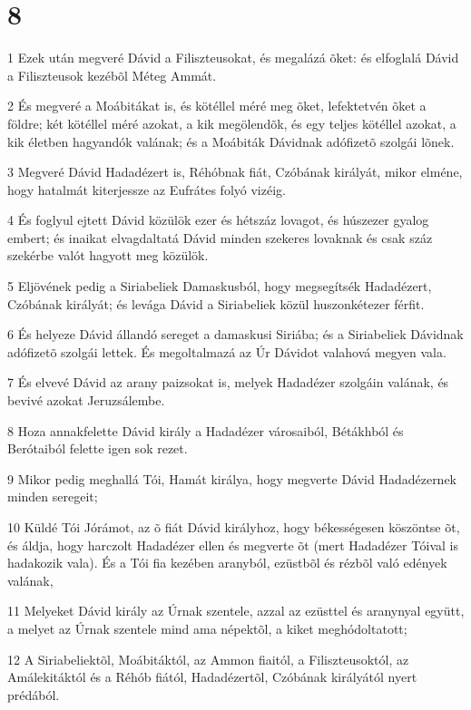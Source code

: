 \chapter{8}

\par 1 Ezek után megveré Dávid a Filiszteusokat, és megalázá õket: és elfoglalá Dávid a Filiszteusok kezébõl Méteg Ammát.
\par 2 És megveré a Moábitákat is, és kötéllel méré meg õket, lefektetvén õket a földre; két kötéllel méré azokat, a kik megölendõk, és egy teljes kötéllel azokat, a kik életben hagyandók valának; és a Moábiták Dávidnak  adófizetõ szolgái lõnek.
\par 3 Megveré Dávid Hadadézert is, Réhóbnak fiát, Czóbának királyát, mikor elméne, hogy hatalmát kiterjessze az Eufrátes folyó vizéig.
\par 4 És foglyul ejtett Dávid közülök ezer és hétszáz lovagot, és húszezer gyalog embert; és inaikat elvagdaltatá Dávid minden szekeres lovaknak és csak száz szekérbe valót hagyott meg közülök.
\par 5 Eljövének pedig a Siriabeliek Damaskusból, hogy megsegítsék Hadadézert, Czóbának királyát; és levága Dávid a Siriabeliek közül huszonkétezer férfit.
\par 6 És helyeze Dávid állandó sereget a damaskusi Siriába; és a Siriabeliek Dávidnak adófizetõ szolgái lettek. És megoltalmazá az Úr Dávidot valahová megyen vala.
\par 7 És elvevé Dávid az arany paizsokat is, melyek Hadadézer szolgáin valának, és bevivé azokat Jeruzsálembe.
\par 8 Hoza annakfelette Dávid király a Hadadézer városaiból, Bétákhból és Berótaiból felette igen sok rezet.
\par 9 Mikor pedig meghallá Tói, Hamát királya, hogy megverte Dávid Hadadézernek minden seregeit;
\par 10 Küldé Tói Jórámot, az õ fiát Dávid királyhoz, hogy békességesen köszöntse õt, és áldja, hogy harczolt Hadadézer ellen és megverte õt (mert Hadadézer Tóival is hadakozik vala). És a Tói fia kezében aranyból, ezüstbõl és rézbõl való edények valának,
\par 11 Melyeket Dávid király az Úrnak szentele, azzal az ezüsttel és aranynyal együtt, a melyet az Úrnak szentele mind ama népektõl, a kiket meghódoltatott;
\par 12 A Siriabeliektõl, Moábitáktól, az Ammon fiaitól, a Filiszteusoktól, az  Amálekitáktól és a Réhób fiától, Hadadézertõl, Czóbának királyától nyert prédából.
